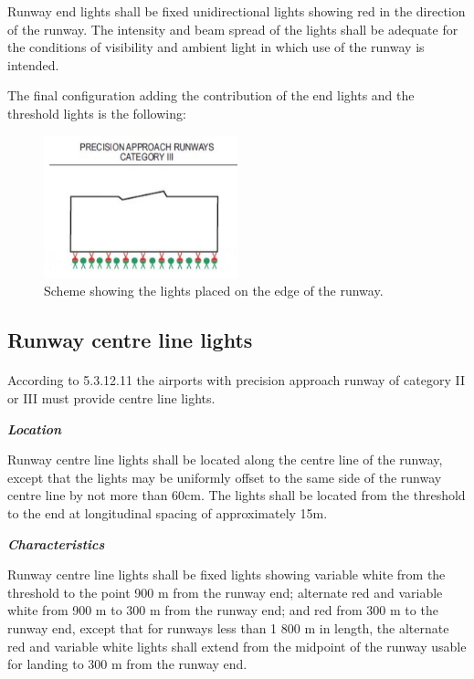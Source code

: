 		Runway end lights shall be fixed unidirectional lights showing red in the direction of the runway. The intensity and beam spread of the lights shall be adequate for the conditions of visibility and ambient light in which use of the runway is intended.
		
		The final configuration adding the contribution of the end lights and the threshold lights is the following:
		
		\begin{figure}[H]
			\centering
			\includegraphics[clip, trim=0cm 0cm 0cm 0cm, width=0.5\textwidth]{./images/Annex14/endlights}
			\caption{Scheme showing the lights placed on the edge of the runway.} %
			\label{} %
		\end{figure}
		
		\subsection{Runway centre line lights}
		\paragraph{}According to 5.3.12.11 the airports with precision approach runway of category II or III must provide centre line lights.
		
		 \textbf{\textit{Location}}
		 
		 Runway centre line lights shall be located along the centre line of the runway, except that the lights may be uniformly offset to the same side of the runway centre line by not more than 60cm. The lights shall be located from the threshold to the end at longitudinal spacing of approximately 15m.
		
		\textbf{\textit{Characteristics}}
		
		Runway centre line lights shall be fixed lights showing variable white from the threshold to the point 900 m from the runway end; alternate red and variable white from 900 m to 300 m from the runway end; and red from 300 m to the runway end, except that for runways less than 1 800 m in length, the alternate red and variable white lights shall extend from the midpoint of the runway usable for landing to 300 m from the runway end.
		
